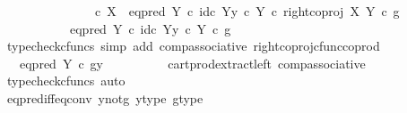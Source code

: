\begin{isabellebody}
\ \ \ \ \isamarkupfalse%
\ {\isacharminus}{\kern0pt}\isanewline
\ \ \ \ \ \ \isamarkupfalse%
\ {\isachardoublequoteopen}{\isacharparenleft}{\kern0pt}{\isasymf}\ {\isasymcirc}\isactrlsub c\ {\isasymbeta}\isactrlbsub X\isactrlesub {\isacharparenright}{\kern0pt}\ {\isasymamalg}\ {\isacharparenleft}{\kern0pt}eq{\isacharunderscore}{\kern0pt}pred\ Y\ {\isasymcirc}\isactrlsub c\ {\isasymlangle}id\isactrlsub c\ Y{\isacharcomma}{\kern0pt}y\ {\isasymcirc}\isactrlsub c\ {\isasymbeta}\isactrlbsub Y\isactrlesub {\isasymrangle}{\isacharparenright}{\kern0pt}\ {\isasymcirc}\isactrlsub c\ right{\isacharunderscore}{\kern0pt}coproj\ X\ Y\ {\isasymcirc}\isactrlsub c\ g\isanewline
\ \ \ \ \ \ \ \ \ \ {\isacharequal}{\kern0pt}\ {\isacharparenleft}{\kern0pt}eq{\isacharunderscore}{\kern0pt}pred\ Y\ {\isasymcirc}\isactrlsub c\ {\isasymlangle}id\isactrlsub c\ Y{\isacharcomma}{\kern0pt}y\ {\isasymcirc}\isactrlsub c\ {\isasymbeta}\isactrlbsub Y\isactrlesub {\isasymrangle}{\isacharparenright}{\kern0pt}\ {\isasymcirc}\isactrlsub c\ g{\isachardoublequoteclose}\isanewline
\ \ \ \ \ \ \ \ \isamarkupfalse%
\ {\isacharparenleft}{\kern0pt}typecheck{\isacharunderscore}{\kern0pt}cfuncs{\isacharcomma}{\kern0pt}\ simp\ add{\isacharcolon}{\kern0pt}\ comp{\isacharunderscore}{\kern0pt}associative{}\ right{\isacharunderscore}{\kern0pt}coproj{\isacharunderscore}{\kern0pt}cfunc{\isacharunderscore}{\kern0pt}coprod{\isacharparenright}{\kern0pt}\isanewline
\ \ \ \ \ \ \isamarkupfalse%
\ \isamarkupfalse%
\ {\isachardoublequoteopen}{\isachardot}{\kern0pt}{\isachardot}{\kern0pt}{\isachardot}{\kern0pt}\ {\isacharequal}{\kern0pt}\ eq{\isacharunderscore}{\kern0pt}pred\ Y\ {\isasymcirc}\isactrlsub c\ {\isasymlangle}g{\isacharcomma}{\kern0pt}y{\isasymrangle}{\isachardoublequoteclose}\isanewline
\ \ \ \ \ \ \ \ \isamarkupfalse%
\ cart{\isacharunderscore}{\kern0pt}prod{\isacharunderscore}{\kern0pt}extract{\isacharunderscore}{\kern0pt}left\ comp{\isacharunderscore}{\kern0pt}associative{}\ \isamarkupfalse%
\ {\isacharparenleft}{\kern0pt}typecheck{\isacharunderscore}{\kern0pt}cfuncs{\isacharcomma}{\kern0pt}\ auto{\isacharparenright}{\kern0pt}\isanewline
\ \ \ \ \ \ \isamarkupfalse%
\ \isamarkupfalse%
\ {\isachardoublequoteopen}{\isachardot}{\kern0pt}{\isachardot}{\kern0pt}{\isachardot}{\kern0pt}\ {\isacharequal}{\kern0pt}\ {\isasymf}{\isachardoublequoteclose}\isanewline
\ \ \ \ \ \ \ \ \isamarkupfalse%
\ eq{\isacharunderscore}{\kern0pt}pred{\isacharunderscore}{\kern0pt}iff{\isacharunderscore}{\kern0pt}eq{\isacharunderscore}{\kern0pt}conv\ y{\isacharunderscore}{\kern0pt}not{\isacharunderscore}{\kern0pt}g\ y{\isacharunderscore}{\kern0pt}type\ g{\isacharunderscore}{\kern0pt}type\ \isamarkupfalse%

\end{isabellebody}
